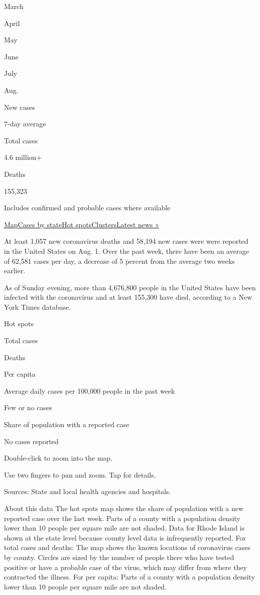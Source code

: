 March

April

May

June

July

Aug.

New cases

7-day average

Total cases

4.6 million+

Deaths

155,323

Includes confirmed and probable cases where available

\protect\hyperlink{map}{Map}\protect\hyperlink{states}{Cases by
state}\protect\hyperlink{hotspots}{Hot
spots}\protect\hyperlink{clusters}{Clusters}\href{https://www.nytimes3xbfgragh.onion/2020/08/02/world/coronavirus-covid-19.html}{Latest
news »}

At least 1,057 new coronavirus deaths and 58,194 new cases were were
reported in the United States on Aug. 1. Over the past week, there have
been an average of 62,581 cases per day, a decrease of 5 percent from
the average two weeks earlier.

As of Sunday evening, more than 4,676,800 people in the United States
have been infected with the coronavirus and at least 155,300 have died,
according to a New York Times database.

Hot spots

Total cases

Deaths

Per capita

Average daily cases per 100,000 people in the past week

Few or no cases

Share of population with a reported case

No cases reported

Double-click to zoom into the map.

Use two fingers to pan and zoom. Tap for details.

Sources: State and local health agencies and hospitals.

About this data The hot spots map shows the share of population with a
new reported case over the last week. Parts of a county with a
population density lower than 10 people per square mile are not shaded.
Data for Rhode Island is shown at the state level because county level
data is infrequently reported. For total cases and deaths: The map shows
the known locations of coronavirus cases by county. Circles are sized by
the number of people there who have tested positive or have a probable
case of the virus, which may differ from where they contracted the
illness. For per capita: Parts of a county with a population density
lower than 10 people per square mile are not shaded.

